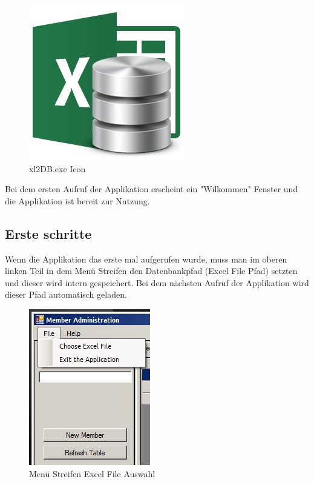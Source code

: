 \documentclass{article}
\begin{document}
\begin{figure}[h]
	\begin{center}
		\centering
		\includegraphics[width=0.1\paperwidth]{Icon}
		\caption{xl2DB.exe Icon}
	\end{center}
\end{figure}

Bei dem ersten Aufruf der Applikation erscheint ein "Wilkommen" Fenster und die Applikation ist bereit zur Nutzung.

\newpage

\subsection*{Erste schritte}
Wenn die Applikation das erste mal aufgerufen wurde, muss man im oberen linken Teil in dem Menü Streifen den Datenbankpfad (Excel File Pfad) setzten und dieser wird intern gespeichert. Bei dem nächsten Aufruf der Applikation wird dieser Pfad automatisch geladen. 

\begin{figure}[h]
	\begin{center}
		\includegraphics[width=0.2\paperwidth]{Pfads}
		\caption{Menü Streifen Excel File Auswahl}
	\end{center}
\end{figure}
\end{document}
